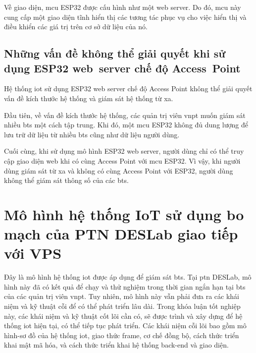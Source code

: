 Về giao diện, \acrshort{mcu} ESP32 được cấu hình như một web server. Do đó, \acrshort{mcu} này cung cấp một giao diện tĩnh hiển thị các tương tác phục vụ cho việc hiển thị và điều khiển các giá trị trên cơ sở dữ liệu của nó.

\subsection{Những vấn đề không thể giải quyết khi sử dụng ESP32 web~server chế độ Access~Point}

Hệ thống \acrshort{iot} sử dụng ESP32 web server chế độ Access Point không thể giải quyết vấn đề kích thước hệ thống và giám sát hệ thống từ xa.

Đầu tiên, về vấn đề kích thước hệ thống, các quản trị viên \acrshort{vnpt} muốn giám sát nhiều \acrshort{bts} một cách tập trung. Khi đó, một \acrshort{mcu} ESP32 không đủ dung lượng để lưu trữ dữ liệu từ nhiều \acrshort{bts} cũng như dữ liệu người dùng.

Cuối cùng, khi sử dụng mô hình ESP32 web server, người dùng chỉ có thể truy cập giao diện web khi có cùng Access Point với \acrshort{mcu} ESP32. Vì vậy, khi người dùng giám sát từ xa và không có cùng Access Point với ESP32, người dùng không thể giám sát thông số của các \acrshort{bts}.

\section{Mô hình hệ thống IoT sử dụng bo mạch của PTN DESLab giao tiếp với VPS}

Đây là mô hình hệ thống \acrshort{iot} được áp dụng để giám sát \acrshort{bts}. Tại \acrshort{ptn} DESLab, mô hình này đã có kết quả để chạy và thử nghiệm trong thời gian ngắn hạn tại \acrshort{bts} của các quản trị viên \acrshort{vnpt}. Tuy nhiên, mô hình này vẫn phải đưa ra các khái niệm và kỹ thuật cỗi để có thể phát triển lâu dài. Trong khóa luận tốt nghiệp này, các khái niệm và kỹ thuật cốt lõi cần có, sẽ được trình và xây dựng để hệ thống \acrshort{iot} hiện tại, có thể tiếp tục phát triển. Các khái niệm cỗi lõi bao gồm mô hình-sơ đồ của hệ thống \acrshort{iot}, giao thức frame, cơ chế đồng bộ, cách thức triển khai mật mã hóa, và cách thức triển khai hệ thống back-end và giao diện.

